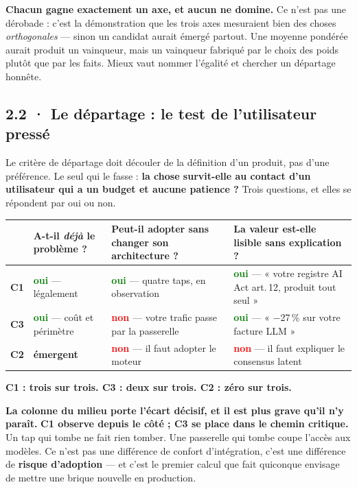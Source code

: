 \documentclass[10pt]{article}
\newcommand{\best}[1]{\textcolor{green}{\textbf{#1}}}
\newcommand{\pire}[1]{\textcolor{red}{\textbf{#1}}}
\newcommand{\pc}{\,\%}
\newcommand{\oui}{\best{oui}}
\newcommand{\non}{\pire{non}}
\begin{document}
\textbf{Chacun gagne exactement un axe, et aucun ne domine.} Ce n'est pas une dérobade : c'est la
démonstration que les trois axes mesuraient bien des choses \emph{orthogonales} --- sinon un candidat
aurait émergé partout. Une moyenne pondérée aurait produit un vainqueur, mais un vainqueur fabriqué par
le choix des poids plutôt que par les faits. Mieux vaut nommer l'égalité et chercher un départage
honnête.

\subsection{2.2 · Le départage : le test de l'utilisateur pressé}

Le critère de départage doit découler de la définition d'un produit, pas d'une préférence. Le seul qui
le fasse : \textbf{la chose survit-elle au contact d'un utilisateur qui a un budget et aucune
patience ?} Trois questions, et elles se répondent par oui ou non.

\renewcommand{\arraystretch}{1.25}
\begin{center}\small
\begin{tabular}{@{}>{\raggedright\arraybackslash}p{3.0cm} >{\raggedright\arraybackslash}p{3.3cm} >{\raggedright\arraybackslash}p{4.6cm} >{\raggedright\arraybackslash}p{5.0cm}@{}}
\toprule
& \textbf{A-t-il \emph{déjà} le problème ?} & \textbf{Peut-il adopter sans changer son architecture ?} & \textbf{La valeur est-elle lisible sans explication ?} \\
\midrule
\textbf{C1} & \oui{} --- légalement & \oui{} --- quatre taps, en observation & \oui{} --- « votre registre AI Act art.\,12, produit tout seul » \\
\textbf{C3} & \oui{} --- coût et périmètre & \non{} --- votre trafic passe par la passerelle & \oui{} --- « $-$27\pc{} sur votre facture LLM » \\
\textbf{C2} & \textcolor{amber}{\textbf{émergent}} & \non{} --- il faut adopter le moteur & \non{} --- il faut expliquer le consensus latent \\
\bottomrule
\end{tabular}
\end{center}

\textbf{C1 : trois sur trois. C3 : deux sur trois. C2 : zéro sur trois.}

\begin{alerte}
\textbf{La colonne du milieu porte l'écart décisif, et il est plus grave qu'il n'y paraît.}
\textbf{C1 observe depuis le côté ; C3 se place dans le chemin critique.} Un tap qui tombe ne fait rien
tomber. Une passerelle qui tombe coupe l'accès aux modèles. Ce n'est pas une différence de confort
d'intégration, c'est une différence de \textbf{risque d'adoption} --- et c'est le premier calcul que
fait quiconque envisage de mettre une brique nouvelle en production.
\end{alerte}
\end{document}
